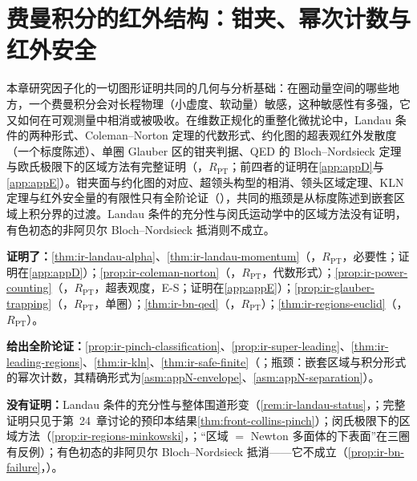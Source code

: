 \chapter{费曼积分的红外结构：钳夹、幂次计数与红外安全}\label{ch:ir}

本章研究因子化的一切图形证明共同的几何与分析基础：在圈动量空间的哪些地方，一个费曼积分会对长程物理（小虚度、软动量）敏感，这种敏感性有多强，它又如何在可观测量中相消或被吸收。在维数正规化的重整化微扰论中，Landau 条件的两种形式、Coleman--Norton 定理的代数形式、约化图的超表观红外发散度（一个标度陈述）、单圈 Glauber 区的钳夹判据、QED 的 Bloch--Nordsieck 定理与欧氏极限下的区域方法有完整证明（\tagR，$R_{\mathrm{PT}}$；前四者的证明在\cref{app:appD}与\cref{app:appE}）。钳夹面与约化图的对应、超领头构型的相消、领头区域定理、KLN 定理与红外安全量的有限性只有全阶论证（\tagA），共同的瓶颈是从标度陈述到嵌套区域上积分界的过渡。Landau 条件的充分性与闵氏运动学中的区域方法没有证明，有色初态的非阿贝尔 Bloch--Nordsieck 抵消则不成立。

\begin{tcolorbox}[enhanced,breakable,title=本章证明了什么／没有证明什么,fonttitle=\bfseries,
  colback=gray!3!white,colframe=gray!55!black,boxrule=0.6pt,arc=2pt,
  left=5pt,right=5pt,top=3pt,bottom=3pt,before skip=6pt,after skip=6pt]
\textbf{证明了：}\cref{thm:ir-landau-alpha}、\cref{thm:ir-landau-momentum}（\tagR，$R_{\mathrm{PT}}$，必要性；证明在\cref{app:appD}）；\cref{prop:ir-coleman-norton}（\tagR，$R_{\mathrm{PT}}$，代数形式）；\cref{prop:ir-power-counting}（\tagR，$R_{\mathrm{PT}}$，超表观度，E-S；证明在\cref{app:appE}）；\cref{prop:ir-glauber-trapping}（\tagR，$R_{\mathrm{PT}}$，单圈）；\cref{thm:ir-bn-qed}（\tagR，$R_{\mathrm{PT}}$）；\cref{thm:ir-regions-euclid}（\tagR，$R_{\mathrm{PT}}$）。\par
\textbf{给出全阶论证：}\cref{prop:ir-pinch-classification}、\cref{prop:ir-super-leading}、\cref{thm:ir-leading-regions}、\cref{thm:ir-kln}、\cref{thm:ir-safe-finite}（\tagA；瓶颈：嵌套区域与积分形式的幂次计数，其精确形式为\cref{asm:appN-envelope}、\cref{asm:appN-separation}）。\par
\textbf{没有证明：}Landau 条件的充分性与整体围道形变（\cref{rem:ir-landau-status}，\tagA；完整证明只见于第~24~章讨论的预印本结果\cref{thm:front-collins-pinch}）；闵氏极限下的区域方法（\cref{prop:ir-regions-minkowski}，\tagP；“区域 $=$ Newton 多面体的下表面”在三圈有反例）；有色初态的非阿贝尔 Bloch--Nordsieck 抵消——它不成立（\cref{prop:ir-bn-failure}，\tagV）。
\end{tcolorbox}

